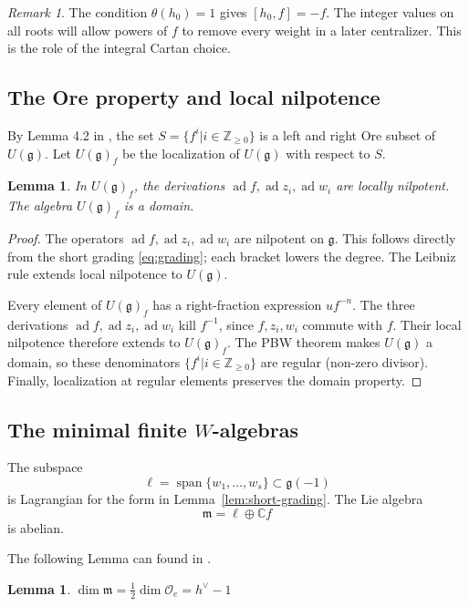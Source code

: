 \documentclass[12pt,a4paper]{amsart}
\numberwithin{equation}{section}
\newtheorem{lemma}[theorem]{Lemma}
\theoremstyle{definition}
\theoremstyle{remark}
\newtheorem{remark}[theorem]{Remark}
\newcommand{\C}{\mathbb{C}}
\newcommand{\g}{\mathfrak g}
\newcommand{\m}{\mathfrak m}
\newcommand{\Z}{\mathbb Z}
\newcommand{\ad}{\operatorname{ad}}
\newcommand{\Uf}{U(\g)_f}
\begin{document}
\begin{remark}\label{rem:integrality}
The condition \(\theta(h_0)=1\) gives \([h_0,f]=-f\).
The integer values on all roots will allow powers of \(f\) to remove
every weight in a later centralizer. This is the role of the
integral Cartan choice.
\end{remark}

\subsection{The Ore property and local nilpotence}


By Lemma 4.2 in \cite{Mathieu}, the set $S=\{f^i| i\in \Z_{\geq 0}\}$ is a left and right Ore subset of $U(\g)$.  Let $\Uf$
be the localization of $U(\g)$ with respect to $S$.


\begin{lemma}\label{lem:Ore}
In \(\Uf\), the derivations
\(\ad f,\ad z_i,\ad w_i\) are locally nilpotent.
The algebra \(\Uf\) is a domain.
\end{lemma}

\begin{proof}
The operators \(\ad f,\ad z_i,\ad w_i\) are nilpotent on \(\g\).
This follows directly from the short grading \eqref{eq:grading};
each bracket lowers the degree.
The Leibniz rule extends local nilpotence to \(U(\g)\).




Every element of \(\Uf\) has a right-fraction expression \(uf^{-n}\).
The three derivations \(\ad f,\ad z_i,\ad w_i\)  kill \(f^{-1}\), since \( f, z_i, w_i\)  commute with \(f\). Their local nilpotence therefore
extends to \(\Uf\).
The PBW theorem makes \(U(\g)\) a domain, so these denominators
$\{f^i| i\in \Z_{\geq 0}\}$ are regular (non-zero divisor). Finally, localization at regular elements preserves the domain property.
\end{proof}


\subsection{\texorpdfstring{The minimal finite $W$-algebras}{The minimal finite W-algebras}}
\label{subsec:W-algebra}
 The subspace
\[
 \ell=\operatorname{span}\{w_1,\ldots,w_s\}\subset\g(-1)
\]
is Lagrangian for the form in Lemma~\ref{lem:short-grading}.
The Lie algebra
\[
 \m=\ell\oplus\C f
\]
is abelian.

The following Lemma can found in \cite{Pr2}.

\begin{lemma}\label{lem:dim}$\dim \m=\frac{1}{2}\dim\mathcal{O}_{e}=h^{\vee}-1$
\end{lemma}
\end{document}
